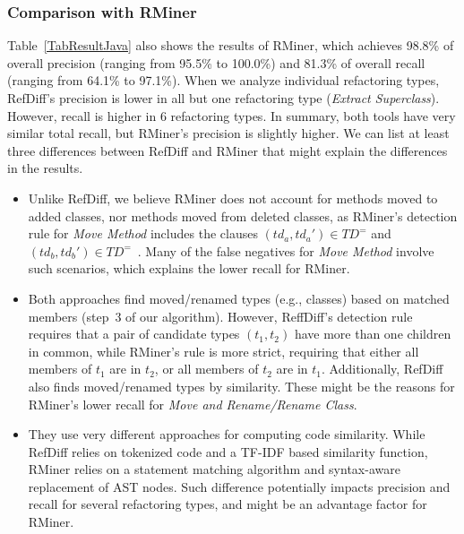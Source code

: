 \subsubsection{Comparison with RMiner}

Table~\ref{TabResultJava} also shows the results of RMiner, which achieves 98.8\% of overall precision (ranging from 95.5\% to 100.0\%) and 81.3\% of overall recall (ranging from 64.1\% to 97.1\%).
When we analyze individual refactoring types, RefDiff's precision is lower in all but one refactoring type (\emph{Extract Superclass}). However, recall is higher in 6 refactoring types.
In summary, both tools have very similar total recall, but RMiner's precision is slightly higher.
We can list at least three differences between RefDiff and RMiner that might explain the differences in the results.
\begin{itemize}

\item Unlike RefDiff, we believe RMiner does not account for methods moved to added classes, nor methods moved from deleted classes, as RMiner's detection rule for \emph{Move Method} includes the clauses $(\mathit{td}_a, \mathit{td}_a') \in TD^=$ and $(\mathit{td}_b, \mathit{td}_b') \in TD^=$~\citep{tsantalis2018rminer}.
Many of the false negatives for \emph{Move Method} involve such scenarios, which explains the lower recall for RMiner.


\item Both approaches find moved/renamed types (e.g., classes) based on matched members (step~3 of our algorithm). However, ReffDiff's detection rule requires that a pair of candidate types $(t_1, t_2)$ have more than one children in common, while RMiner's rule is more strict, requiring that either all members of $t_1$ are in $t_2$, or all members of $t_2$ are in $t_1$.
Additionally, RefDiff also finds moved/renamed types by similarity. 
These might be the reasons for RMiner's lower recall for \emph{Move and Rename/Rename Class}.

\item They use very different approaches for computing code similarity. While RefDiff relies on tokenized code and a TF-IDF based similarity function, RMiner relies on a statement matching algorithm and syntax-aware replacement of AST nodes.
Such difference potentially impacts precision and recall for several refactoring types, and might be an advantage factor for RMiner.
\end{itemize}

